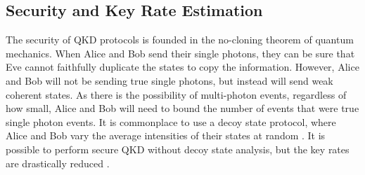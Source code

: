 %
%
%
%
%
%
%
%
%
%
%
%


\subsection{Security and Key Rate Estimation}

The security of \ac{QKD} protocols is founded in the no-cloning theorem of quantum mechanics. When Alice and Bob send their single photons, they can be sure that Eve cannot faithfully duplicate the states to copy the information. However, Alice and Bob will not be sending true single photons, but instead will send weak coherent states. As there is the possibility of multi-photon events, regardless of how small, Alice and Bob will need to bound the number of events that were true single photon events. It is commonplace to use a decoy state protocol, where Alice and Bob vary the average intensities of their states at random \cite{Hwang2003}. It is possible to perform secure \ac{QKD} without decoy state analysis, but the key rates are drastically reduced \cite{Lo2005}.

